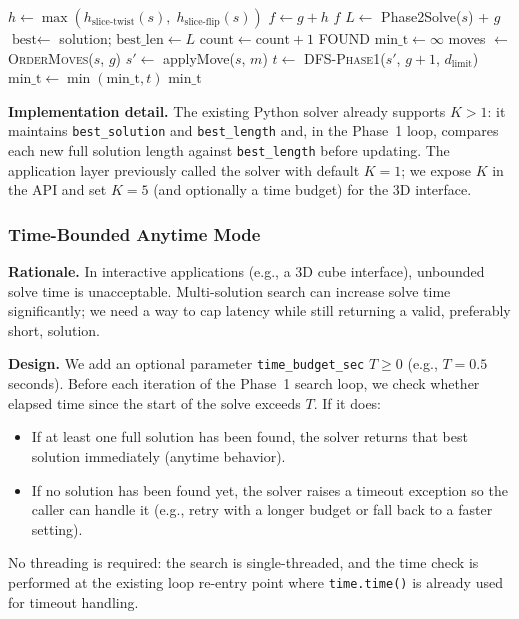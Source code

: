 \documentclass[10pt,twocolumn,a4paper]{article}
\begin{document}
\begin{algorithm}[t]
\caption{\textsc{DFS-Phase1}($s$, $g$, $d_{\text{limit}}$)}
\label{alg:dfs-phase1}
\begin{algorithmic}[1]
\STATE $h \gets \max(h_{\text{slice-twist}}(s),\; h_{\text{slice-flip}}(s))$
\STATE $f \gets g + h$
  \RETURN $f$ 
\ENDIF
{} 
  \STATE $L \gets$ Phase2Solve($s$) + $g$
    \STATE $\text{best} \gets$ solution; $\text{best\_len} \gets L$
  \ENDIF
  \STATE $\text{count} \gets \text{count} + 1$
  \RETURN FOUND
\ENDIF
\STATE $\text{min\_t} \gets \infty$
\STATE moves $\gets$ \textsc{OrderMoves}($s$, $g$) 
  \STATE $s' \gets$ applyMove($s$, $m$)
  \STATE $t \gets$ \textsc{DFS-Phase1}($s'$, $g{+}1$, $d_{\text{limit}}$)
  \STATE $\text{min\_t} \gets \min(\text{min\_t}, t)$
\ENDFOR
\RETURN $\text{min\_t}$
\end{algorithmic}
\end{algorithm}

\textbf{Implementation detail.} The existing Python solver already supports $K>1$: it maintains \texttt{best\_solution} and \texttt{best\_length} and, in the Phase~1 loop, compares each new full solution length against \texttt{best\_length} before updating. The application layer previously called the solver with default $K=1$; we expose $K$ in the API and set $K=5$ (and optionally a time budget) for the 3D interface.

\subsubsection{Time-Bounded Anytime Mode}
\label{sec:anytime}

\textbf{Rationale.} In interactive applications (e.g., a 3D cube interface), unbounded solve time is unacceptable. Multi-solution search can increase solve time significantly; we need a way to cap latency while still returning a valid, preferably short, solution.

\textbf{Design.} We add an optional parameter \texttt{time\_budget\_sec} $T \geq 0$ (e.g., $T = 0.5$ seconds). Before each iteration of the Phase~1 search loop, we check whether elapsed time since the start of the solve exceeds $T$. If it does:
\begin{itemize}
  \item If at least one full solution has been found, the solver returns that best solution immediately (anytime behavior).
  \item If no solution has been found yet, the solver raises a timeout exception so the caller can handle it (e.g., retry with a longer budget or fall back to a faster setting).
\end{itemize}
No threading is required: the search is single-threaded, and the time check is performed at the existing loop re-entry point where \texttt{time.time()} is already used for timeout handling.
\end{document}
